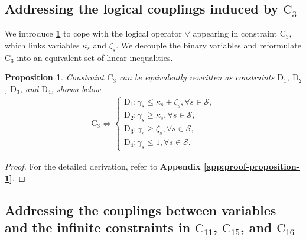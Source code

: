 \documentclass[10pt,journal,compsoc]{IEEEtran}
\newtheorem{proposition}{Proposition}
\theoremstyle{myremark}
\theoremstyle{myexample}
\begin{document}
\subsection{Addressing the logical couplings induced by $ \mathrm{C}_{3} $}
We introduce \textbf{\cref{thm:proposition-1}} to cope with the logical operator $ \lor $ appearing in constraint $ \mathrm{C}_{3} $, which links variables $ \kappa_s $ and $ \zeta_s $. We decouple the binary variables and reformulate $ \mathrm{C}_{3} $ into an equivalent set of linear inequalities.
\begin{proposition} \label{thm:proposition-1}
	Constraint $ \mathrm{C}_{3} $ can be equivalently rewritten as constraints $ \mathrm{D}_{1} $, $ \mathrm{D}_{2} $, $ \mathrm{D}_{3} $, and $ \mathrm{D}_{4} $, shown below
	\begin{align} \nonumber
		\mathrm{C}_{3} \Leftrightarrow
			\begin{cases}
				   	\mathrm{D}_{1}: \gamma_s \leq \kappa_s + \zeta_s, \forall s \in \mathcal{S}, 
				   	\\	
				   	\mathrm{D}_{2}: \gamma_s \geq \kappa_s, \forall s \in \mathcal{S},   
				   	\\	
				   	\mathrm{D}_{3}: \gamma_s \geq \zeta_s, \forall s \in \mathcal{S},
				   	\\	
				   	\mathrm{D}_{4}: \gamma_s \leq 1, \forall s \in \mathcal{S}. 
			\end{cases}
	\end{align}
\end{proposition} 
\begin{proof} 
	For the detailed derivation, refer to \textbf{Appendix \ref{app:proof-proposition-1}}.
\end{proof}





\subsection{Addressing the couplings between variables and the infinite constraints in $ \mathrm{C}_{11} $, $ \mathrm{C}_{15} $, and $ \mathrm{C}_{16} $}
\end{document}

